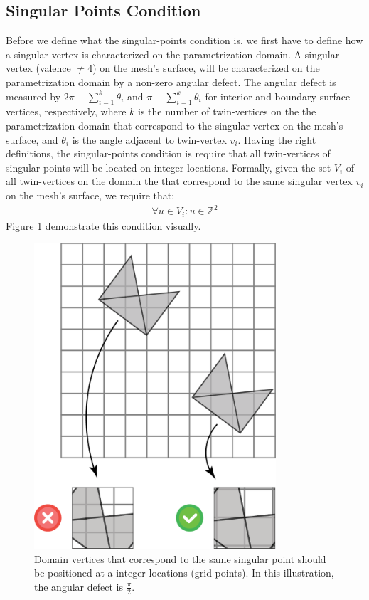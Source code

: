 \subsection{Singular Points Condition}
\label{label:singular_points_cond}
Before we define what the singular-points condition is, we first have to define how a singular vertex is characterized on the parametrization domain. A singular-vertex (valence $\neq 4$) on the mesh's surface, will be characterized on the parametrization domain by a non-zero angular defect. The angular defect is measured by $2\pi - \sum_{i=1}^k \theta_i$ and $\pi - \sum_{i=1}^k \theta_i$ for interior and boundary surface vertices, respectively, where $k$ is the number of twin-vertices on the the parametrization domain that correspond to the singular-vertex on the mesh's surface, and $\theta_i$ is the angle adjacent to twin-vertex $v_i$.
Having the right definitions, the singular-points condition is require that all twin-vertices of singular points will be located on integer locations. Formally, given the set $V_i$ of all twin-vertices on the domain the that correspond to the same singular vertex $v_i$ on the mesh's surface, we require that:
\begin{equation}\label{eq:singular_points_cond}
\begin{split}
\forall u \in V_i: u \in \mathbb{Z}^2
\end{split}
\end{equation}
Figure \ref{fig:singular_points_req} demonstrate this condition visually.
\begin{figure}[ht]
\centering
\includegraphics[width=9cm]{figures/singular_points/singularity.png}
\caption[The Singular Points Requirement]{Domain vertices that correspond to the same singular point should be positioned at a integer locations (grid points). In this illustration, the angular defect is $\frac{\pi}{2}$.}
\label{fig:singular_points_req}
\end{figure}
